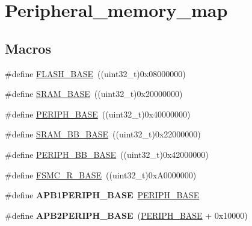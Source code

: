 \hypertarget{group___peripheral__memory__map}{\section{Peripheral\-\_\-memory\-\_\-map}
\label{group___peripheral__memory__map}
}
\subsection*{Macros}
\begin{DoxyCompactItemize}
\item 
\#define \hyperlink{group___peripheral__memory__map_ga23a9099a5f8fc9c6e253c0eecb2be8db}{F\-L\-A\-S\-H\-\_\-\-B\-A\-S\-E}~((uint32\-\_\-t)0x08000000)
\item 
\#define \hyperlink{group___peripheral__memory__map_ga05e8f3d2e5868754a7cd88614955aecc}{S\-R\-A\-M\-\_\-\-B\-A\-S\-E}~((uint32\-\_\-t)0x20000000)
\item 
\#define \hyperlink{group___peripheral__memory__map_ga9171f49478fa86d932f89e78e73b88b0}{P\-E\-R\-I\-P\-H\-\_\-\-B\-A\-S\-E}~((uint32\-\_\-t)0x40000000)
\item 
\#define \hyperlink{group___peripheral__memory__map_gad3548b6e2f017f39d399358f3ac98454}{S\-R\-A\-M\-\_\-\-B\-B\-\_\-\-B\-A\-S\-E}~((uint32\-\_\-t)0x22000000)
\item 
\#define \hyperlink{group___peripheral__memory__map_gaed7efc100877000845c236ccdc9e144a}{P\-E\-R\-I\-P\-H\-\_\-\-B\-B\-\_\-\-B\-A\-S\-E}~((uint32\-\_\-t)0x42000000)
\item 
\#define \hyperlink{group___peripheral__memory__map_gaddf0e199dccba83272b20c9fb4d3aaed}{F\-S\-M\-C\-\_\-\-R\-\_\-\-B\-A\-S\-E}~((uint32\-\_\-t)0x\-A0000000)
\item 
\hypertarget{group___peripheral__memory__map_ga45666d911f39addd4c8c0a0ac3388cfb}{\#define {\bfseries A\-P\-B1\-P\-E\-R\-I\-P\-H\-\_\-\-B\-A\-S\-E}~\hyperlink{group___peripheral__memory__map_ga9171f49478fa86d932f89e78e73b88b0}{P\-E\-R\-I\-P\-H\-\_\-\-B\-A\-S\-E}}\label{group___peripheral__memory__map_ga45666d911f39addd4c8c0a0ac3388cfb}

\item 
\hypertarget{group___peripheral__memory__map_ga25b99d6065f1c8f751e78f43ade652cb}{\#define {\bfseries A\-P\-B2\-P\-E\-R\-I\-P\-H\-\_\-\-B\-A\-S\-E}~(\hyperlink{group___peripheral__memory__map_ga9171f49478fa86d932f89e78e73b88b0}{P\-E\-R\-I\-P\-H\-\_\-\-B\-A\-S\-E} + 0x10000)}\label{group___peripheral__memory__map_ga25b99d6065f1c8f751e78f43ade652cb}


\end{DoxyCompactItemize}
